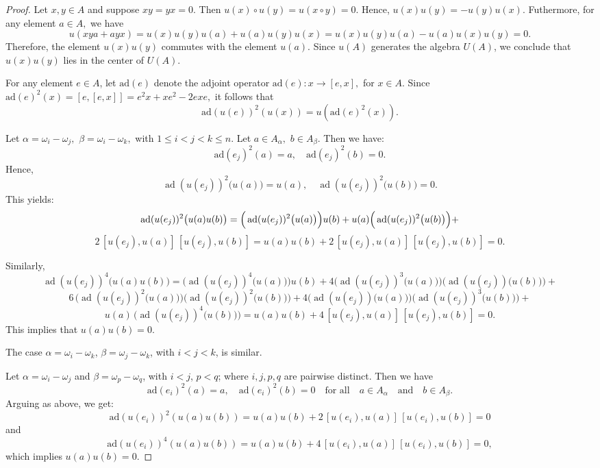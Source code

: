 \documentclass[12pt]{amsart}
\begin{document}
{\begin{proof} Let $ x, y \in A $ and suppose $  x y = y x =0. $  
Then   $
u(x)\circ u(y) = u(x \circ y) =0 .$  Hence, $u(x) u(y)=-u(y) u(x).$
Futhermore, for any element $a\in A,$ we have $$ u(xya +ayx)=u(x) u(y) u(a) + u(a) u(y) u(x) = u(x) u(y) u(a) - u(a) u(x) u(y) =0. $$ Therefore, the element $u(x) u(y)$ commutes with the element $u(a).$ Since $u(A)$ generates the algebra $U(A)$, we conclude that $u(x) u(y)$ lies in the center of $U(A).$

For any element $e\in A$, let $\text{ad}(e)$ denote the adjoint operator $\text{ad}(e):x \to [e,x],$ for $x\in A.$  Since $\text{ad}(e)^2 (x)= [e,[e,x]]=e^2 x + x e^2 - 2 exe,$ it follows that  $$ \text{ad}(u(e))^2 (u(x)) =u(\text{ad}(e)^2(x)) .$$ 

Let $\alpha = \omega_i - \omega_j,$ $\beta =\omega_i - \omega_k,$ with $1 \leq i < j< k \leq n.$ Let $a\in A_{\alpha},$ $b\in A_{\beta}.$ Then we have: $$\text{ad}(e_j)^2 (a)= a, \quad \text{ad}(e_j)^2 (b)= 0.$$
Hence,
\[
\operatorname{ad}(u(e_j))^2\big(u(a)\big) = u(a), \quad \operatorname{ad}(u(e_j))^2\big(u(b)\big) = 0.
\]
This yields:
\[
	\operatorname{ad}(u(e_j))^2\big(u(a)u(b)\big) = \Big(\operatorname{ad}(u(e_j))^2\big(u(a)\big)\Big) u(b)+ \\
	 u(a)\Big(\operatorname{ad}(u(e_j))^2\big(u(b)\big)\Big) + \]
\[	  2\, [u(e_j), u(a)] \, [ u(e_j) , u(b) ]= u(a) u(b)+ 2\, [u(e_j), u(a)] \, [ u(e_j) , u(b) ] = 0.
\]


Similarly,
\[
	\operatorname{ad}(u(e_j))^4\big(u(a)u(b)\big)  = \Big(\operatorname{ad}(u(e_j))^4\big(u(a)\big)\Big) u(b)+4  
	\Big(\operatorname{ad}(u(e_j))^3\big(u(a)\big)\Big) \Big(\operatorname{ad}(u(e_j))\big(u(b)\big)\Big) + \]
	\[	  6\, 	\Big(\operatorname{ad}(u(e_j))^2\big(u(a)\big)\Big) \Big(\operatorname{ad}(u(e_j))^2\big(u(b)\big)\Big) + 4  \Big(\operatorname{ad}(u(e_j))\big(u(a)\big)\Big) \Big(\operatorname{ad}(u(e_j))^3\big(u(b)\big)\Big)+ \]
	\[	u(a) \, \Big(\operatorname{ad}(u(e_j))^4\big(u(b)\big)\Big) =
	u(a) u(b)+ 4\, [u(e_j), u(a)] \, [ u(e_j) , u(b) ] =0.
\] This implies that $u(a) u(b) = 0$.

The case $\alpha = \omega_i - \omega_k$, $\beta = \omega_j - \omega_k$, with $i < j < k$, is similar.

Let $\alpha = \omega_i - \omega_j$ and $\beta = \omega_p - \omega_q$, with $i < j$, $p < q$; where $i,j,p,q$ are pairwise distinct. Then we have
\[
\text{ad}(e_i)^2 (a) = a, \quad \text{ad}(e_i)^2 (b) = 0 \quad \text{for all} \quad a\in A_{\alpha} \quad \text{and} \quad b\in A_{\beta}. 
\] 
Arguing as above, we get:
\[
\text{ad}(u(e_i))^2 \left( u(a) u(b) \right) = u(a) u(b) + 2\, [u(e_i), u(a)] \, [ u(e_i) , u(b) ]  = 0
\]
and
\[
\text{ad}(u(e_i))^4 \left( u(a) u(b) \right) = u(a) u(b) + 4\, [u(e_i), u(a)] \, [ u(e_i) , u(b) ]  = 0,
\]
which implies $u(a) u(b) = 0$.



\end{proof}}
\end{document}
